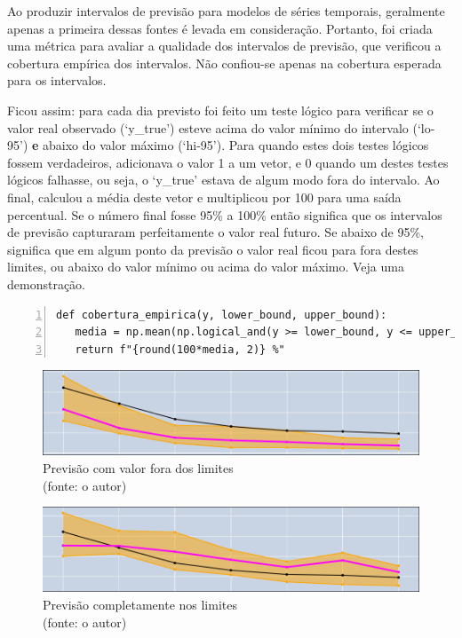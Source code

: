 Ao produzir intervalos de previsão para modelos de séries temporais, geralmente apenas a primeira dessas fontes é levada em consideração. Portanto, foi criada uma métrica para avaliar a qualidade dos intervalos de previsão, que verificou a cobertura empírica dos intervalos. Não confiou-se apenas na cobertura esperada para os intervalos.

Ficou assim: para cada dia previsto foi feito um teste lógico para verificar se o valor real observado (`y\_true') esteve acima do valor mínimo do intervalo (`lo-95') \textbf{e} abaixo do valor máximo (`hi-95'). Para quando estes dois testes lógicos fossem verdadeiros, adicionava o valor 1 a um vetor, e 0 quando um destes testes lógicos falhasse, ou seja, o `y\_true' estava de algum modo fora do intervalo. Ao final, calculou a média deste vetor e multiplicou por 100 para uma saída percentual. Se o número final fosse 95\% a 100\% então significa que os intervalos de previsão capturaram perfeitamente o valor real futuro. Se abaixo de 95\%, significa que em algum ponto da previsão o valor real ficou para fora destes limites, ou abaixo do valor mínimo ou acima do valor máximo. Veja uma demonstração.

\begin{Verbatim}[frame=single, numbers=left]
def cobertura_empirica(y, lower_bound, upper_bound):
   media = np.mean(np.logical_and(y >= lower_bound, y <= upper_bound))
   return f"{round(100*media, 2)} %"
\end{Verbatim}

\begin{figure}[!h]
	\centering
	\includegraphics[scale=0.40]{Figuras/intervalo_previsao_1.png}
	\caption{Previsão com valor fora dos limites\\(fonte: o autor)}
	\label{fig:intervalo_previsao_1}
\end{figure}

\begin{figure}[!h]
	\centering
	\includegraphics[scale=0.40]{Figuras/intervalo_previsao_2.png}
	\caption{Previsão completamente nos limites\\(fonte: o autor)}
	\label{fig:intervalo_previsao_2}
\end{figure}

